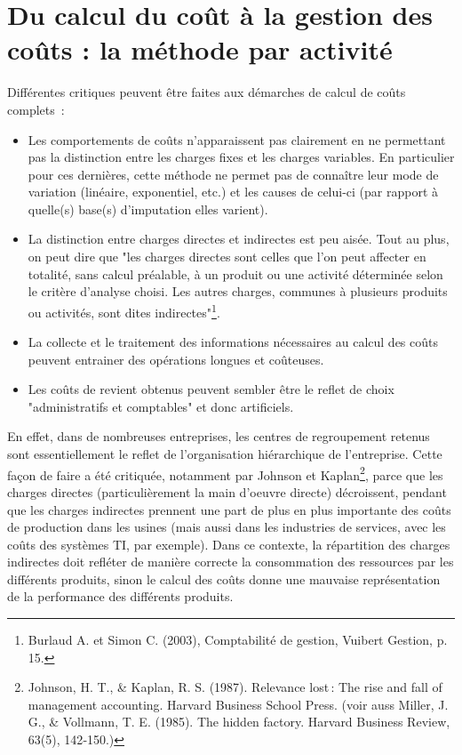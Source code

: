 \documentclass[oneside]{kaobook}
\begin{document}
\section{Du calcul du coût à la gestion des coûts : la méthode par activité}
\label{sec:orgb98f0a3}
Différentes critiques peuvent être faites aux démarches de calcul de coûts complets :
\begin{itemize}
\item Les comportements de coûts n'apparaissent pas clairement en ne permettant pas la distinction entre les charges fixes et les charges variables. En particulier pour ces dernières, cette méthode ne permet pas de connaître leur mode de variation (linéaire, exponentiel, etc.) et les causes de celui-ci (par rapport à quelle(s) base(s) d'imputation elles varient).
\item La distinction entre charges directes et indirectes est peu aisée. Tout au plus, on peut dire que "les charges directes sont celles que l'on peut affecter en totalité, sans calcul préalable, à un produit ou une activité déterminée selon le critère d'analyse choisi. Les autres charges, communes à plusieurs produits ou activités, sont dites indirectes"\footnote{Burlaud A. et Simon C. (2003), Comptabilité de gestion, Vuibert Gestion, p. 15.}.
\item La collecte et le traitement des informations nécessaires au calcul des coûts peuvent entrainer des opérations longues et coûteuses.
\item Les coûts de revient obtenus peuvent sembler être le reflet de choix "administratifs et comptables" et donc artificiels.
\end{itemize}

En effet, dans de nombreuses entreprises, les centres de regroupement retenus sont essentiellement le reflet de l'organisation hiérarchique de l'entreprise. Cette façon de faire a été critiquée, notamment par Johnson et Kaplan\footnote{Johnson, H. T., \& Kaplan, R. S. (1987). Relevance lost : The rise and fall of management accounting. Harvard Business School Press. (voir auss Miller, J. G., \& Vollmann, T. E. (1985). The hidden factory. Harvard Business Review, 63(5), 142‑150.)}, parce que les charges directes (particulièrement la main d'oeuvre directe) décroissent, pendant que les charges indirectes prennent une part de plus en plus importante des coûts de production dans les usines (mais aussi dans les industries de services, avec les coûts des systèmes TI, par exemple). Dans ce contexte, la répartition des charges indirectes doit refléter de manière correcte la consommation des ressources par les différents produits, sinon le calcul des coûts donne une mauvaise représentation de la performance des différents produits.
\end{document}
